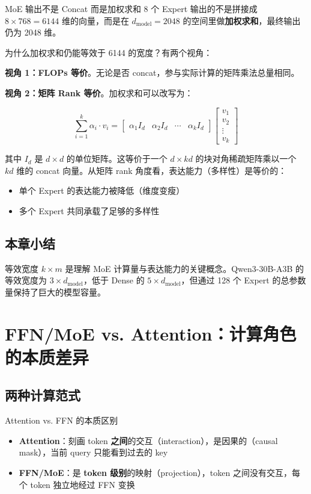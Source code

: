 \documentclass[a4paper]{article}
\begin{document}
\begin{warningbox}{MoE 输出不是 Concat 而是加权求和}
8 个 Expert 输出的不是拼接成 $8 \times 768 = 6144$ 维的向量，而是在 $d_{\text{model}} = 2048$ 的空间里做\textbf{加权求和}，最终输出仍为 2048 维。
\end{warningbox}

为什么加权求和仍能等效于 6144 的宽度？有两个视角：

\textbf{视角 1：FLOPs 等价}。无论是否 concat，参与实际计算的矩阵乘法总量相同。

\textbf{视角 2：矩阵 Rank 等价}。加权求和可以改写为：

$$
\sum_{i=1}^{k} \alpha_i \cdot v_i = \begin{bmatrix} \alpha_1 I_d & \alpha_2 I_d & \cdots & \alpha_k I_d \end{bmatrix} \begin{bmatrix} v_1 \\ v_2 \\ \vdots \\ v_k \end{bmatrix}
$$

其中 $I_d$ 是 $d \times d$ 的单位矩阵。这等价于一个 $d \times kd$ 的块对角稀疏矩阵乘以一个 $kd$ 维的 concat 向量。从矩阵 rank 角度看，表达能力（多样性）是等价的：
\begin{itemize}
  \item 单个 Expert 的表达能力被降低（维度变瘦）
  \item 多个 Expert 共同承载了足够的多样性
\end{itemize}

\subsection{本章小结}

等效宽度 $k \times m$ 是理解 MoE 计算量与表达能力的关键概念。Qwen3-30B-A3B 的等效宽度为 $3 \times d_{\text{model}}$，低于 Dense 的 $5 \times d_{\text{model}}$，但通过 128 个 Expert 的总参数量保持了巨大的模型容量。

\section{FFN/MoE vs. Attention：计算角色的本质差异}

\subsection{两种计算范式}

\begin{importantbox}{Attention vs. FFN 的本质区别}
\begin{itemize}
  \item \textbf{Attention}：刻画 token \textbf{之间}的交互（interaction），是因果的（causal mask），当前 query 只能看到过去的 key
  \item \textbf{FFN/MoE}：是 \textbf{token 级别}的映射（projection），token 之间没有交互，每个 token 独立地经过 FFN 变换
\end{itemize}
\end{importantbox}
\end{document}
